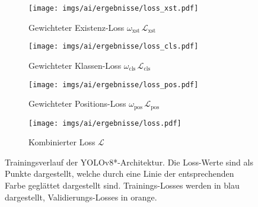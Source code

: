 \begin{figure}
    \centering
    \begin{subfigure}{\linewidth}
        \raggedleft
        \texttt{[image: imgs/ai/ergebnisse/loss\_xst.pdf]}
        \hspace{2.3cm}
        \caption{Gewichteter Existenz-Loss $\omega_\text{xst}\,\mathcal{L}_\text{xst}$}
    \end{subfigure}
    \vspace{0.1cm}
    \par

    \begin{subfigure}{\linewidth}
        \raggedleft
        \texttt{[image: imgs/ai/ergebnisse/loss\_cls.pdf]}
        \hspace{2.3cm}
        \caption{Gewichteter Klassen-Loss $\omega_\text{cls}\,\mathcal{L}_\text{cls}$}
    \end{subfigure}
    \vspace{0.1cm}
    \par

    \begin{subfigure}{\linewidth}
        \raggedleft
        \texttt{[image: imgs/ai/ergebnisse/loss\_pos.pdf]}
        \hspace{2.3cm}
        \caption{Gewichteter Positions-Loss $\omega_\text{pos}\,\mathcal{L}_\text{pos}$}
    \end{subfigure}
    \vspace{0.1cm}
    \par

    \begin{subfigure}{\linewidth}
        \raggedleft
        \texttt{[image: imgs/ai/ergebnisse/loss.pdf]}
        \hspace{2.3cm}
        \caption{Kombinierter Loss $\mathcal{L}$}
    \end{subfigure}

    \caption{Trainingsverlauf der YOLOv8*-Architektur. Die Loss-Werte sind als Punkte dargestellt, welche durch eine Linie der entsprechenden Farbe geglättet dargestellt sind. Trainings-Losses werden in blau dargestellt, Validierungs-Losses in orange.}
    \label{img:trainingsverlauf}
\end{figure}



